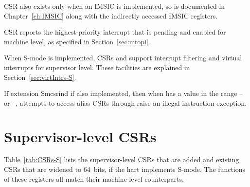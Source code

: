 CSR  also exists only when an IMSIC is implemented,
so is documented in Chapter~\ref{ch:IMSIC}
along with the indirectly accessed IMSIC registers.

CSR  reports the highest-priority interrupt that is pending
and enabled for machine level, as specified in Section~\ref{sec:mtopi}.

When \mbox{S-mode} is implemented, CSRs  and 
support interrupt
filtering and virtual interrupts for supervisor level.
These facilities are explained in Section~\ref{sec:virtIntrs-S}.

If extension Smcsrind if also implemented, then when 
has a value in the range -- or --,
attempts to access alias CSRs  through 
raise an illegal instruction exception.

\section{Supervisor-level CSRs}

Table~\ref{tab:CSRs-S} lists the supervisor-level CSRs that are added
and existing CSRs that are widened to 64~bits,
if the hart implements \mbox{S-mode}.
The functions of these registers all match their machine-level
counterparts.

